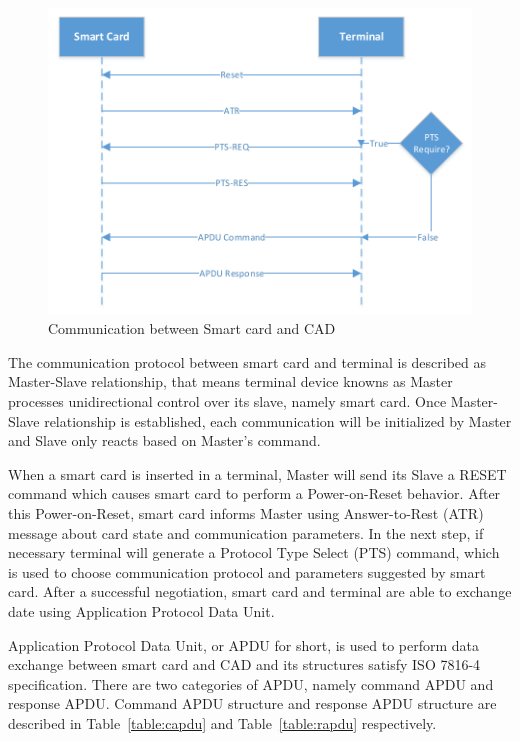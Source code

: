 \documentclass[]{llncs}
\begin{document}
\begin{figure}[!htbp]
	\centering
	\includegraphics[width=1.0\textwidth]{master-slave-relationship}
		\caption[ ]{Communication between Smart card and CAD\cite{handbuch}}
	\label{fig:master-slave-relationship}
\end{figure}
The communication protocol between smart card and terminal is described as Master-Slave relationship\cite{handbuch}, that means terminal device knowns as Master processes unidirectional control over its slave, namely smart card. Once Master-Slave relationship is established, each communication will be initialized by Master and Slave only reacts based on Master's command. 

When a smart card is inserted in a terminal, Master will send its Slave a RESET command which causes smart card to perform a Power-on-Reset behavior. After this Power-on-Reset, smart card informs Master using Answer-to-Rest (ATR) message about card state and communication parameters. In the next step, if necessary terminal will generate a Protocol Type Select (PTS) command, which is used to choose communication protocol and parameters suggested by smart card. After a successful negotiation, smart card and terminal are able to exchange date using Application Protocol Data Unit.
  
Application Protocol Data Unit, or APDU for short, is used  to perform data exchange between smart card and CAD and its structures satisfy ISO 7816-4 specification\cite{chen}. There are two categories of APDU, namely command APDU and response APDU. Command APDU structure and response APDU structure are described in Table~\ref{table:capdu} and Table~\ref{table:rapdu} respectively\cite{handbuch}. 
\end{document}
